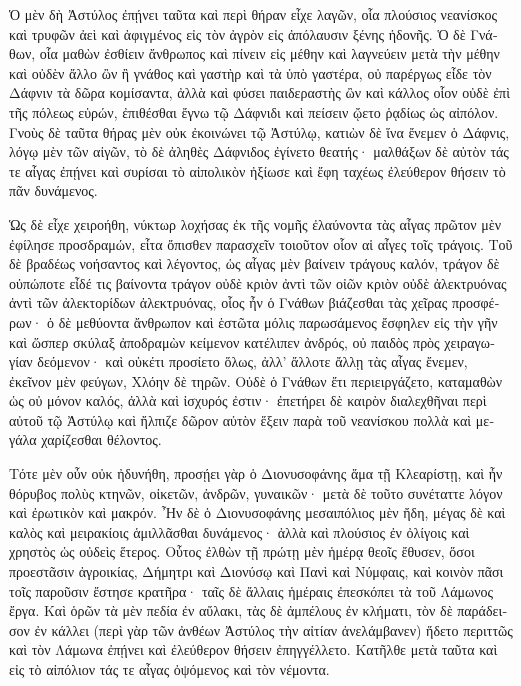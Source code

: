 \documentclass{book}
\begin{document}
\begin{pairs}
\begin{Leftside}
\begin{greek}
  Ὁ μὲν δὴ Ἀστύλος ἐπῄνει ταῦτα καὶ περὶ θήραν εἶχε λαγῶν, οἷα πλούσιος νεανίσκος καὶ τρυφῶν ἀεὶ καὶ ἀφιγμένος εἰς τὸν ἀγρὸν εἰς ἀπόλαυσιν ξένης ἡδονῆς.  Ὁ δὲ Γνάθων, οἷα μαθὼν ἐσθίειν ἄνθρωπος καὶ πίνειν εἰς μέθην καὶ λαγνεύειν μετὰ τὴν μέθην καὶ οὐδὲν ἄλλο ὢν ἢ γνάθος καὶ γαστὴρ καὶ τὰ ὑπὸ γαστέρα, οὐ παρέργως εἶδε τὸν Δάφνιν τὰ δῶρα κομίσαντα, ἀλλὰ καὶ φύσει παιδεραστὴς ὢν καὶ κάλλος οἷον οὐδὲ ἐπὶ τῆς πόλεως εὑρών, ἐπιθέσθαι ἔγνω τῷ Δάφνιδι καὶ πείσειν ᾤετο ῥᾳδίως ὡς αἰπόλον.  Γνοὺς δὲ ταῦτα θήρας μὲν οὐκ ἐκοινώνει τῷ Ἀστύλῳ, κατιὼν δὲ ἵνα ἔνεμεν ὁ Δάφνις, λόγῳ μὲν τῶν αἰγῶν, τὸ δὲ ἀληθὲς Δάφνιδος ἐγίνετο θεατής· μαλθάξων δὲ αὐτὸν τάς τε αἶγας ἐπῄνει καὶ συρίσαι τὸ αἰπολικὸν ἠξίωσε καὶ ἔφη ταχέως ἐλεύθερον θήσειν τὸ πᾶν δυνάμενος.
\pend


  Ὡς δὲ εἶχε χειροήθη, νύκτωρ λοχήσας ἐκ τῆς νομῆς ἐλαύνοντα τὰς αἶγας πρῶτον μὲν ἐφίλησε προσδραμών, εἶτα ὄπισθεν παρασχεῖν τοιοῦτον οἷον αἱ αἶγες τοῖς τράγοις.  Τοῦ δὲ βραδέως νοήσαντος καὶ λέγοντος, ὡς αἶγας μὲν βαίνειν τράγους καλόν, τράγον δὲ οὐπώποτε εἶδέ τις βαίνοντα τράγον οὐδὲ κριὸν ἀντὶ τῶν οἰῶν κριὸν οὐδὲ ἀλεκτρυόνας ἀντὶ τῶν ἀλεκτορίδων ἀλεκτρυόνας, οἷος ἦν ὁ Γνάθων βιάζεσθαι τὰς χεῖρας προσφέρων·  ὁ δὲ μεθύοντα ἄνθρωπον καὶ ἑστῶτα μόλις παρωσάμενος ἔσφηλεν εἰς τὴν γῆν καὶ ὥσπερ σκύλαξ ἀποδραμὼν κείμενον κατέλιπεν ἀνδρός, οὐ παιδὸς πρὸς χειραγωγίαν δεόμενον· καὶ οὐκέτι προσίετο ὅλως, ἀλλ’ ἄλλοτε ἄλλῃ τὰς αἶγας ἔνεμεν, ἐκεῖνον μὲν φεύγων, Χλόην δὲ τηρῶν.  Οὐδὲ ὁ Γνάθων ἔτι περιειργάζετο, καταμαθὼν ὡς οὐ μόνον καλός, ἀλλὰ καὶ ἰσχυρός ἐστιν· ἐπετήρει δὲ καιρὸν διαλεχθῆναι περὶ αὐτοῦ τῷ Ἀστύλῳ καὶ ἤλπιζε δῶρον αὐτὸν ἕξειν παρὰ τοῦ νεανίσκου πολλὰ καὶ μεγάλα χαρίζεσθαι θέλοντος.
\pend


  Τότε μὲν οὖν οὐκ ἠδυνήθη, προσῄει γὰρ ὁ Διονυσοφάνης ἅμα τῇ Κλεαρίστῃ, καὶ ἦν θόρυβος πολὺς κτηνῶν, οἰκετῶν, ἀνδρῶν, γυναικῶν· μετὰ δὲ τοῦτο συνέταττε λόγον καὶ ἐρωτικὸν καὶ μακρόν.  Ἦν δὲ ὁ Διονυσοφάνης μεσαιπόλιος μὲν ἤδη, μέγας δὲ καὶ καλὸς καὶ μειρακίοις ἁμιλλᾶσθαι δυνάμενος· ἀλλὰ καὶ πλούσιος ἐν ὀλίγοις καὶ χρηστὸς ὡς οὐδεὶς ἕτερος.  Οὗτος ἐλθὼν τῇ πρώτῃ μὲν ἡμέρᾳ θεοῖς ἔθυσεν, ὅσοι προεστᾶσιν ἀγροικίας, Δήμητρι καὶ Διονύσῳ καὶ Πανὶ καὶ Νύμφαις, καὶ κοινὸν πᾶσι τοῖς παροῦσιν ἔστησε κρατῆρα· ταῖς δὲ ἄλλαις ἡμέραις ἐπεσκόπει τὰ τοῦ Λάμωνος ἔργα.  Καὶ ὁρῶν τὰ μὲν πεδία ἐν αὔλακι, τὰς δὲ ἀμπέλους ἐν κλήματι, τὸν δὲ παράδεισον ἐν κάλλει (περὶ γὰρ τῶν ἀνθέων Ἀστύλος τὴν αἰτίαν ἀνελάμβανεν) ἥδετο περιττῶς καὶ τὸν Λάμωνα ἐπῄνει καὶ ἐλεύθερον θήσειν ἐπηγγέλλετο.  Κατῆλθε μετὰ ταῦτα καὶ εἰς τὸ αἰπόλιον τάς τε αἶγας ὀψόμενος καὶ τὸν νέμοντα.
\pend



\end{greek}
\end{Leftside}
\end{pairs}
\end{document}
